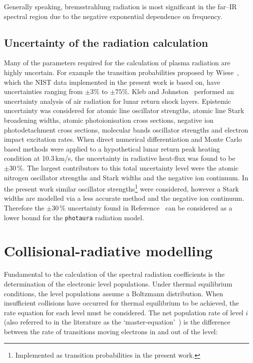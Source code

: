 Generally speaking, bremsstrahlung radiation is most significant in the far--IR spectral region due to the negative exponential dependence on frequency.

\subsection{Uncertainty of the radiation calculation}
\label{sec:rad_uncertainty}

Many of the parameters required for the calculation of plasma radiation are highly uncertain.
For example the transition probabilities proposed by Wiese~\cite{wiese_1996}, which the NIST data implemented in the present work is based on, have uncertainties ranging from $\pm3$\% to $\pm75$\%.
Kleb and Johnston~\cite{KJ2008} performed an uncertainty analysis of air radiation for lunar return shock layers.
Epistemic uncertainty was considered for atomic line oscillator strengths, atomic line Stark broadening widths, atomic photoionisation cross sections, negative ion photodetachment cross sections, molecular bands oscillator strengths and electron impact excitation rates.
When direct numerical differentiation and Monte Carlo based methods were applied to a hypothetical lunar return peak heating condition at 10.3\,km/s, the uncertainty in radiative heat-flux was found to be $\pm 30$\,\%.
The largest contributors to this total uncertainty level were the atomic nitrogen oscillator strengths and Stark widths and the negative ion continuum.
In the present work similar oscillator strengths\footnote{Implemented as transition probabilities in the present work.} were considered, however a Stark widths are modelled via a less accurate method and the negative ion continuum.
Therefore the $\pm 30$\,\% uncertainty found in Reference~\cite{KJ2008} can be considered as a lower bound for the \texttt{photaura} radiation model.


\section{Collisional-radiative modelling}
\label{sec:CR}

Fundamental to the calculation of the spectral radiation coefficients is the determination of the electronic level populations.
Under thermal equilibrium conditions, the level populations assume a Boltzmann distribution.
When insufficient collisions have occurred for thermal equilibrium to be achieved, the rate equation for each level must be considered.
The net population rate of level $i$ (also referred to in the literature as the `master-equation'~\cite{park_1990}) is the difference between the rate of transitions moving electrons in and out of the level:

